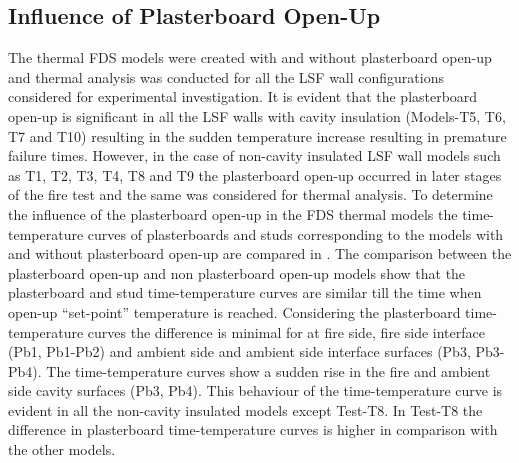 \subsection{Influence of Plasterboard Open-Up}

The thermal FDS models were created with and without plasterboard open-up and thermal analysis was conducted for all the LSF wall configurations considered for experimental investigation. It is evident that the plasterboard open-up is significant in all the LSF walls with cavity insulation (Models-T5, T6, T7 and T10) resulting in the sudden temperature increase resulting in premature failure times. However, in the case of non-cavity insulated LSF wall models such as T1, T2, T3, T4, T8 and T9 the plasterboard open-up occurred in later stages of the fire test and the same was considered for thermal analysis. To determine the influence of the plasterboard open-up in the FDS thermal models the time-temperature curves of plasterboards and studs corresponding to the models with and without plasterboard open-up are compared in . The comparison between the plasterboard open-up and non plasterboard open-up models show that the plasterboard and stud time-temperature curves are similar till the time when open-up ``set-point'' temperature is reached. Considering the plasterboard time-temperature curves the difference is minimal for at fire side, fire side interface (Pb1, Pb1-Pb2) and ambient side and ambient side interface surfaces (Pb3, Pb3-Pb4). The time-temperature curves show a sudden rise in the fire and ambient side cavity surfaces (Pb3, Pb4). This behaviour of the time-temperature curve is evident in all the non-cavity insulated models except Test-T8. In Test-T8 the difference in plasterboard time-temperature curves is higher in comparison with the other models.

